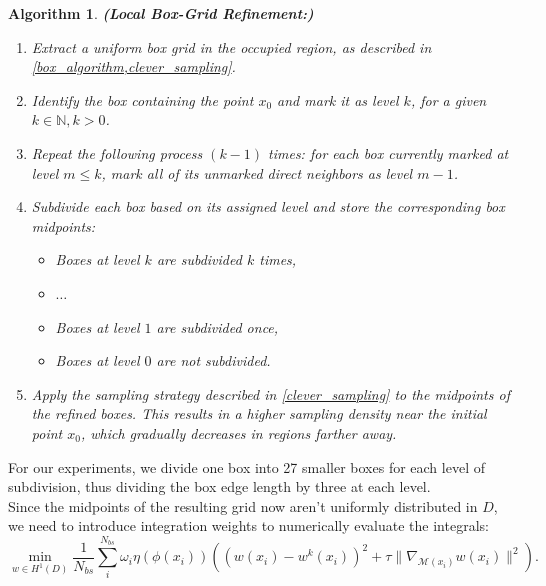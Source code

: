 \documentclass[12pt,openany]{book}
\theoremstyle{plainnormal}
\newtheorem{algorithm}[theorem]{Algorithm}
\theoremstyle{remark}
\begin{document}
\begin{algorithm}\textbf{(Local Box-Grid Refinement:)}
\begin{enumerate}
    \item Extract a uniform box grid in the occupied region, as described in \cref{box_algorithm,clever_sampling}.
    
    \item Identify the box containing the point \(x_0\) and mark it as level \(k\), for a given \(k \in \mathbb{N}, k > 0\).
    
    \item Repeat the following process \((k - 1)\) times: for each box currently marked at level \(m \leq k\), mark all of its unmarked direct neighbors as level \(m - 1\).
    
    \item Subdivide each box based on its assigned level and store the corresponding box midpoints:
    \begin{itemize}
        \item Boxes at level \(k\) are subdivided \(k\) times,
        \item $\dots$
        \item Boxes at level \(1\) are subdivided once,
        \item Boxes at level \(0\) are not subdivided.
    \end{itemize}
    
    \item Apply the sampling strategy described in \cref{clever_sampling} to the midpoints of the refined boxes. This results in a higher sampling density near the initial point \(x_0\), which gradually decreases in regions farther away.
\end{enumerate}
\end{algorithm}
For our experiments, we divide one box into 27 smaller boxes for each level of subdivision, thus dividing the box edge length by three at each level.\\
Since the midpoints of the resulting grid now aren't uniformly distributed in $D$, we need to introduce integration weights to numerically evaluate the integrals: 
\begin{equation*}
    \min_{w\in H^1(D)} \frac{1}{N_{bs}} \sum_i^{N_{bs}} \omega_i \eta(\phi(x_i)) \left((w(x_i) - w^k(x_i))^2 + \tau \|\nabla_{\mathcal{M}(x_i)} w(x_i)\|^2\right).
\end{equation*}
\end{document}
